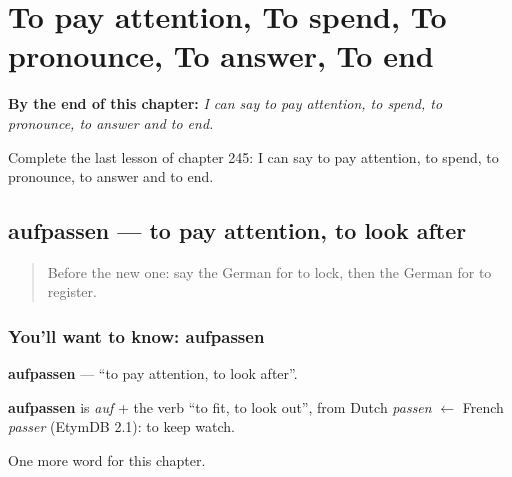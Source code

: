 
\chapter{To pay attention, To spend, To pronounce, To answer, To end}
\label{ch:ge-to-pay-attention-to-spend-to-pronounce-to-answer-to-end}

\begin{chapteropening}
\textbf{By the end of this chapter:} \emph{I can say to pay attention, to spend, to pronounce, to answer and to end.}

Complete the last lesson of chapter 245: I can say to pay attention, to spend, to pronounce, to answer and to end.
\end{chapteropening}

\section[aufpassen]{aufpassen — to pay attention, to look after}

\label{lesson:GE-C245-aufpassen}



\begin{quote}
Before the new one: say the German for to lock, then the German for to register.
\end{quote}

\subsection*{You'll want to know: aufpassen}
\textbf{aufpassen} — \textquotedblleft{}to pay attention, to look after\textquotedblright{}.

\begin{cousinweb}
\textbf{aufpassen} is \emph{auf} + the verb \textquotedblleft{}to fit, to look out\textquotedblright{}, from Dutch \emph{passen} $\leftarrow$ French \emph{passer} (EtymDB 2.1): to keep watch.
\end{cousinweb}

\begin{grammarlens}[title={What you've built}]
One more word for this chapter.
\end{grammarlens}

